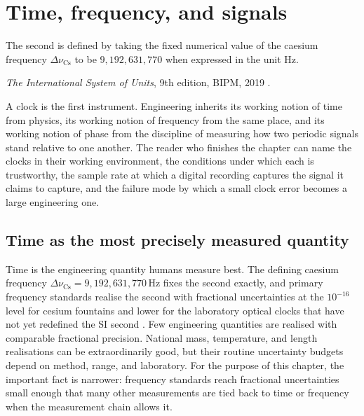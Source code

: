 \chapter{Time, frequency, and signals}
\label{vol01:ch06}

\epigraph{The second is defined by taking the fixed numerical value
of the caesium frequency $\Delta\nu_{\text{Cs}}$ to be
$9{,}192{,}631{,}770$ when expressed in the unit
$\si{\hertz}$.}{\textit{The International System of Units}, 9th
edition, BIPM, 2019 \cite[\S 2.3.1]{std:bipm-si2019}.}


\noindent
A clock is the first instrument. Engineering inherits its working
notion of time from physics, its working notion of frequency from
the same place, and its working notion of phase from the discipline
of measuring how two periodic signals stand relative to one another.
The reader who finishes the chapter can name the clocks in their
working environment, the conditions under which each is trustworthy,
the sample rate at which a digital recording captures the signal it
claims to capture, and the failure mode by which a small clock error
becomes a large engineering one.

\section{Time as the most precisely measured quantity}

Time is the engineering quantity humans measure best. The defining
caesium frequency $\Delta\nu_{\text{Cs}} = 9{,}192{,}631{,}770 \,\si
{\hertz}$ fixes the second exactly, and primary frequency standards
realise the second with fractional uncertainties at the $10^{-16}$
level for cesium fountains and lower for the laboratory optical
clocks that have not yet redefined the SI second
\cite{web:nist-cesium-fountain,web:nist-optical-clock}. Few
engineering quantities are realised with comparable fractional
precision. National mass, temperature, and length realisations can
be extraordinarily good, but their routine uncertainty budgets
depend on method, range, and laboratory. For the purpose of this
chapter, the important fact is narrower: frequency standards reach
fractional uncertainties small enough that many other measurements
are tied back to time or frequency when the measurement chain
allows it.

